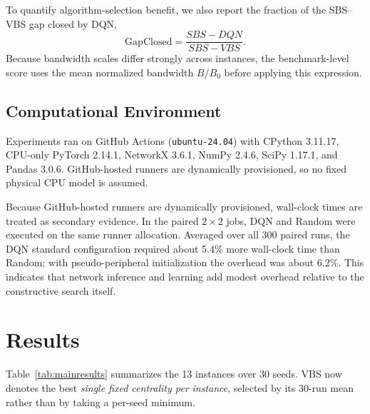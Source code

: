 \documentclass[runningheads]{llncs}
\begin{document}
To quantify algorithm-selection benefit, we also report the fraction of the SBS--VBS gap closed by DQN,
\[
\mathrm{GapClosed}=\frac{SBS-DQN}{SBS-VBS}.
\]
Because bandwidth scales differ strongly across instances, the benchmark-level score uses the mean normalized bandwidth $B/B_0$ before applying this expression.

\subsection{Computational Environment}

Experiments ran on GitHub Actions (\texttt{ubuntu-24.04}) with CPython 3.11.17, CPU-only PyTorch 2.14.1, NetworkX 3.6.1, NumPy 2.4.6, SciPy 1.17.1, and Pandas 3.0.6. GitHub-hosted runners are dynamically provisioned, so no fixed physical CPU model is assumed.

Because GitHub-hosted runners are dynamically provisioned, wall-clock times are treated as secondary evidence. In the paired $2\times2$ jobs, DQN and Random were executed on the same runner allocation. Averaged over all 300 paired runs, the DQN standard configuration required about 5.4\% more wall-clock time than Random; with pseudo-peripheral initialization the overhead was about 6.2\%. This indicates that network inference and learning add modest overhead relative to the constructive search itself.

\section{Results}

Table~\ref{tab:mainresults} summarizes the 13 instances over 30 seeds. VBS now denotes the best \emph{single fixed centrality per instance}, selected by its 30-run mean rather than by taking a per-seed minimum.
\end{document}

